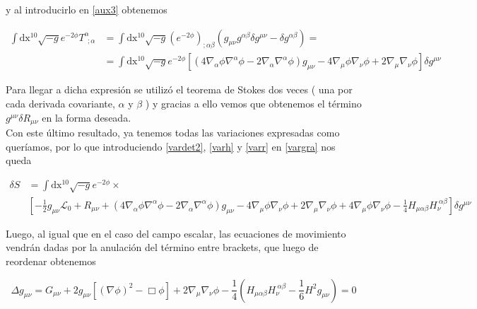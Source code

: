 \documentclass{article}
\numberwithin{equation}{section}
\begin{document}
y al introducirlo en \ref{aux3} obtenemos

\begin{equation*}
\begin{aligned}
\int\mathrm{dx^{10}} \sqrt{-g}e^{-2\phi} T^{\alpha}_{ \ \ ;\alpha} &= \int\mathrm{dx^{10}} \sqrt{-g}\left(e^{-2\phi}\right)_{ ; \alpha\beta} \left(g_{\mu\nu}g^{\alpha\beta} \delta g^{\mu\nu} - \delta g^{\alpha\beta} \right) =\\
&=\int\mathrm{dx^{10}} \sqrt{-g}e^{-2\phi} \left[ \left( 4 \nabla_{\alpha}\phi \nabla^{\alpha} \phi - 2 \nabla_{\alpha}\nabla^{\alpha} \phi \right)g_{\mu\nu} - 4\nabla_{\mu}\phi \nabla_{\nu}\phi + 2 \nabla_{\mu}\nabla_{\nu} \phi  \right]\delta g^{\mu\nu}
\end{aligned}
\end{equation*}

Para llegar a dicha expresión se utilizó el teorema de Stokes dos veces ( una por cada derivada covariante, $ \alpha $ y $ \beta $ ) y gracias a ello vemos que obtenemos el término $ g^{\mu\nu}\delta R_{\mu\nu} $ en la forma deseada.\\
 
Con este último resultado, ya tenemos todas las variaciones expresadas como queríamos, por lo que introduciendo \ref{vardet2}, \ref{varh} y \ref{varr} en \ref{vargra} nos queda

\begin{equation*}
\begin{aligned}
\delta S &= \int\mathrm{dx^{10}}\sqrt{-g} e^{-2\phi} \times \\
&\left[ -\frac{1}{2} g_{\mu\nu}\mathscr{L}_0  + R_{\mu\nu} + \left(4 \nabla_{\alpha}\phi\nabla^{\alpha}\phi  -2\nabla_{\alpha}\nabla^{\alpha}\phi \right)g_{\mu\nu} - 4\nabla_{\mu}\phi \nabla_{\nu}\phi + 2 \nabla_{\mu}\nabla_{\nu} \phi + 4\nabla_{\mu}\phi \nabla_{\nu}\phi -   \frac{1}{4} H_{\mu \alpha \beta}H_{\nu}^{ \ \alpha \beta} \right] \delta g^{\mu\nu} 
\end{aligned}
\end{equation*} 
 
Luego, al igual que en el caso del campo escalar, las ecuaciones de movimiento vendrán dadas por la anulación del término entre brackets, que luego de reordenar obtenemos

\vspace{0.4cm}

\begin{boxquation}
\begin{equation*}
\Delta g_{\mu \nu} = G_{\mu\nu} + 2 g_{\mu\nu} \left[ \left(\nabla \phi\right)^2 - \Box \phi \right] + 2 \nabla_{\mu}\nabla_{\nu} \phi - \frac{1}{4} \left( H_{\mu\alpha\beta} H_{\nu}^{ \ \alpha\beta} - \frac{1}{6} H^2 g_{\mu\nu} \right) = 0
\end{equation*}
\end{boxquation}
\end{document}
